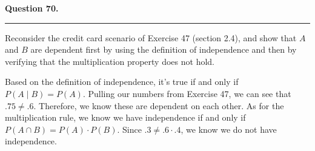 \textbf{Question 70.} \\
\hrule 

Reconsider the credit card scenario of Exercise 47 (section 2.4), and show that $A$ and $B$ are dependent first by using the definition of independence and then by verifying that the multiplication property does not hold.

Based on the definition of independence, it's true if and only if $P(A \; | \; B) = P(A)$.
Pulling our numbers from Exercise 47, we can see that $.75 \neq .6$. Therefore, we know these are dependent on each other. As for the multiplication rule, we know we have independence if and only if $P(A \cap B) = P(A) \cdot P(B)$. Since $.3 \neq .6 \cdot .4$, we know we do not have independence. 